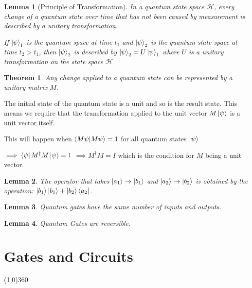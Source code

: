 \documentclass[12pt,twoside,fleqn]{report}
\makeatletter
\theoremstyle{thmstyle}
\renewenvironment{proof}[1][\proofname]{\par
\pushQED{\qed}%
\normalfont \topsep6\p@\@plus6\p@\relax
\trivlist
\item[\hskip\labelsep\itshape#1\@addpunct{.}]\mbox{}\par\nobreak\ignorespaces
}{%
    \popQED\endtrivlist\@endpefalse
    }
\newtheorem{thm}{Theorem}[chapter]
\newtheorem{lemma}{Lemma}[chapter]
\makeatother
\begin{document}
\begin{samepage}
\begin{mdframed}
\begin{lemma}[Principle of Transformation]
    \label{transformation}
    In a quantum state space $\mathcal{H}$, every change of a quantum state over time that has not been caused by measurement is described by a unitary transformation.
    
    If $\ket{\psi}_1$ is the quantum space at time $t_1$ and $\ket{\psi}_2$ is the quantum state space at time $t_2 > t_1$, then $\ket{\psi}_2$ is described by $\ket{\psi}_2 = U \ket{\psi}_1$ where $U$ is a unitary transformation on the state space $\mathcal{H}$
\end{lemma}
\end{mdframed}
\end{samepage}

\begin{thm}
    Any change applied to a quantum state can be represented by a unitary matrix $M$.
\end{thm}
\begin{proof}
    The initial state of the quantum state is a unit and so is the result state. This means we require that the transformation applied to the unit vector $M \ket{\psi}$ is a unit vector itself.

    This will happen when $\braket{M \psi | M\psi} = 1$ for all quantum states $\ket{\psi}$

    $\implies \bra{\psi} M^\dagger M \ket{\psi} = 1$
    $\implies M^\dagger M = I$ which is the condition for $M$ being a unit vector.
\end{proof}


\begin{lemma}
    The operator that takes $\ket{a_1} \to \ket{b_1}$ and $\ket{a_2} \to \ket{b_2}$ is obtained by the operation:
    $\ket{b_1}\ket{b_1} + \ket{b_2}\bra{a_2}$.
\end{lemma}

\begin{lemma}
    Quantum gates have the same number of inputs and outputs.
\end{lemma}

\begin{lemma}
    Quantum Gates are reversible.
\end{lemma}

\chapter{Gates and Circuits}
\line(1,0){360} \\
\end{document}
